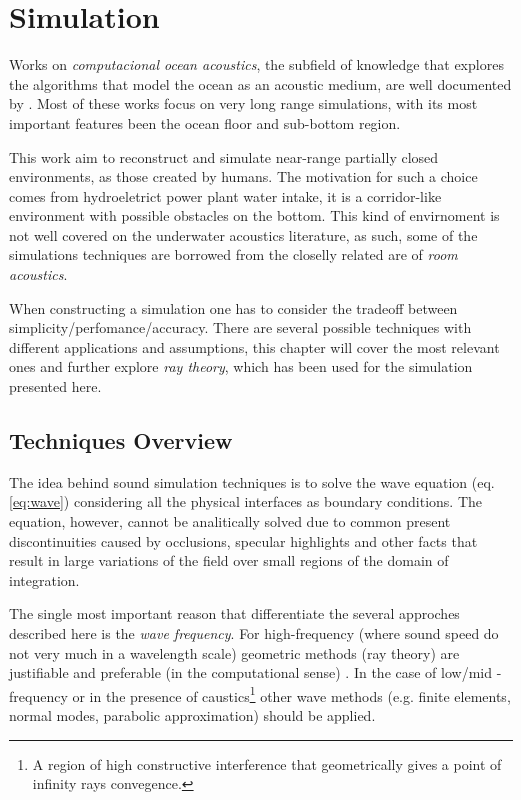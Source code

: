 \section{Simulation}

Works on \textit{computacional ocean
acoustics}, the subfield of knowledge that explores the algorithms that model
the ocean as an acoustic medium, are well documented by
\citet{Etter2013}. Most of these works focus on very long range simulations,
with its most important features been the ocean floor and sub-bottom region.

This work aim to reconstruct and simulate near-range partially closed
environments, as those created by humans. The motivation for such a choice comes
from hydroeletrict power plant water intake, it is a corridor-like environment
with possible obstacles on the bottom. This kind of envirnoment is not well
covered on the underwater acoustics literature, as such, some of the simulations
techniques are borrowed from the closelly related are of \textit{room acoustics}.

When constructing a simulation one has to consider the tradeoff between
simplicity/perfomance/accuracy. There are several possible techniques with
different applications and assumptions, this chapter will cover the most
relevant ones and further explore \textit{ray theory}, which has been used for
the simulation presented here.

\subsection{Techniques Overview}

The idea behind sound simulation techniques is to solve the wave
equation (eq. \ref{eq:wave}) considering all the physical interfaces as boundary
conditions. The equation, however, cannot be analitically solved due to common
present discontinuities caused by occlusions, specular highlights and other
facts that result in large variations of the field over small regions of the
domain of integration\cite{funkhouser2003survey}.

The single most important reason that differentiate the several approches
described here is the \textit{wave frequency}. For high-frequency (where sound
speed do not very much in a wavelength scale) geometric methods (ray theory) are
justifiable and preferable (in the computational sense) \cite{urick1979}. In the
case of low/mid - frequency or in the presence of caustics\footnote{A region of
high constructive interference that geometrically gives a point of infinity
rays convegence.} other wave methods (e.g. finite elements, normal modes,
parabolic approximation) should be applied.

